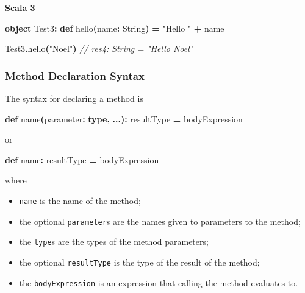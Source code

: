 \documentclass[11pt,a5paper,]{book}
\newenvironment{Shaded}{\begin{snugshade}}{\end{snugshade}}
\newcommand{\CommentTok}[1]{\textcolor[rgb]{0.56,0.35,0.01}{\textit{#1}}}
\newcommand{\ExtensionTok}[1]{#1}
\newcommand{\FunctionTok}[1]{\textcolor[rgb]{0.00,0.00,0.00}{#1}}
\newcommand{\KeywordTok}[1]{\textcolor[rgb]{0.13,0.29,0.53}{\textbf{#1}}}
\newcommand{\NormalTok}[1]{#1}
\newcommand{\OperatorTok}[1]{\textcolor[rgb]{0.81,0.36,0.00}{\textbf{#1}}}
\newcommand{\StringTok}[1]{\textcolor[rgb]{0.31,0.60,0.02}{#1}}
\providecommand{\tightlist}{%
  \setlength{\itemsep}{0pt}\setlength{\parskip}{0pt}}
\begin{document}
\textbf{Scala 3}

\begin{Shaded}
\begin{Highlighting}[]
\KeywordTok{object}\NormalTok{ Test3}\OperatorTok{:}
  \KeywordTok{def} \FunctionTok{hello}\OperatorTok{(}\NormalTok{name}\OperatorTok{:} \ExtensionTok{String}\OperatorTok{)} \OperatorTok{=}
    \StringTok{"Hello "} \OperatorTok{+}\NormalTok{ name}
\end{Highlighting}
\end{Shaded}

\begin{Shaded}
\begin{Highlighting}[]
\NormalTok{Test3}\OperatorTok{.}\FunctionTok{hello}\OperatorTok{(}\StringTok{"Noel"}\OperatorTok{)}
\CommentTok{// res4: String = "Hello Noel"}
\end{Highlighting}
\end{Shaded}

\hypertarget{method-declaration-syntax}{%
\subsubsection*{Method Declaration
Syntax}\label{method-declaration-syntax}}

The syntax for declaring a method is

\begin{Shaded}
\begin{Highlighting}[]
\KeywordTok{def} \FunctionTok{name}\OperatorTok{(}\NormalTok{parameter}\OperatorTok{:} \KeywordTok{type}\OperatorTok{,} \OperatorTok{...):}\NormalTok{ resultType }\OperatorTok{=}
\NormalTok{  bodyExpression}
\end{Highlighting}
\end{Shaded}

or

\begin{Shaded}
\begin{Highlighting}[]
\KeywordTok{def}\NormalTok{ name}\OperatorTok{:}\NormalTok{ resultType }\OperatorTok{=}
\NormalTok{  bodyExpression}
\end{Highlighting}
\end{Shaded}

where

\begin{itemize}
\tightlist
\item
  \texttt{name} is the name of the method;
\item
  the optional \texttt{parameter}s are the names given to parameters to
  the method;
\item
  the \texttt{type}s are the types of the method parameters;
\item
  the optional \texttt{resultType} is the type of the result of the
  method;
\item
  the \texttt{bodyExpression} is an expression that calling the method
  evaluates to.
\end{itemize}
\end{document}
